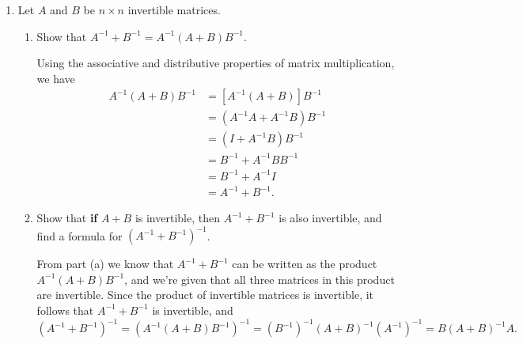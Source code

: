 \documentclass[letterpaper,12pt]{article}
\begin{document}
\begin{enumerate}
{\bf Note:} The most common error here is to forget to reverse the order when taking the transpose. The second most common error, (which is usually caused by the first) is to forget that we can only cancel a matrix and its inverse when they're adjacent: $A^{-1}AB = B$, but $A^{-1}BA$ can't be simplified. With the matrix $B$ in the way, we can't cancel $A$ and $A^{-1}$.

\bigskip

\item Let $A$ and $B$ be $n\times n$ invertible matrices.
\begin{enumerate}
 \item Show that $A^{-1}+B^{-1} = A^{-1}(A+B)B^{-1}$.

\bigskip

 Using the associative and distributive properties of matrix multiplication, we have
\begin{align*}
 A^{-1}(A+B)B^{-1} & = [A^{-1}(A+B)]B^{-1}\\
& = (A^{-1}A+A^{-1}B)B^{-1}\\
& = (I+A^{-1}B)B^{-1}\\
& = B^{-1}+A^{-1}BB^{-1}\\
& = B^{-1}+A^{-1}I\\
& = A^{-1}+B^{-1}.
\end{align*}


\bigskip

 \item Show that {\bf if} $A+B$ is invertible, then $A^{-1}+B^{-1}$ is also invertible, and find a formula for $(A^{-1}+B^{-1})^{-1}$.

\bigskip

 From part (a) we know that $A^{-1}+B^{-1}$ can be written as the product $A^{-1}(A+B)B^{-1}$, and we're given that all three matrices in this product are invertible. Since the product of invertible matrices is invertible, it follows that $A^{-1}+B^{-1}$ is invertible, and
\[
 (A^{-1}+B^{-1})^{-1} = (A^{-1}(A+B)B^{-1})^{-1} = (B^{-1})^{-1}(A+B)^{-1}(A^{-1})^{-1} = B(A+B)^{-1}A.
\]


\end{enumerate}


 \end{enumerate}
\end{document}
